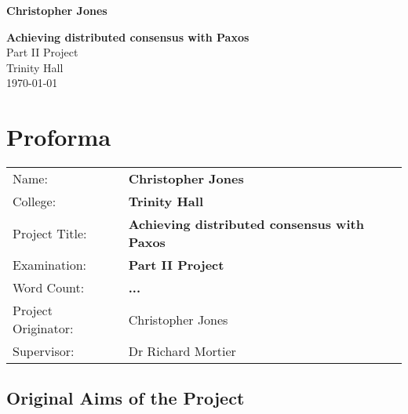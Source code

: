 \documentclass[12pt,twoside,notitlepage]{report}
\begin{document}




\pagestyle{empty}

\hfill{\LARGE \bf Christopher Jones}

\vspace*{60mm}
\begin{center}
\Huge
{\bf Achieving distributed consensus with Paxos} \\
\vspace*{5mm}
Part II Project \\
\vspace*{5mm}
Trinity Hall \\
\vspace*{5mm}
\today  %
\end{center}

\cleardoublepage



\setcounter{page}{1}
\pagestyle{plain}

\chapter*{Proforma}

{\large
\begin{tabular}{ll}
Name:               & \bf Christopher Jones                       \\
College:            & \bf Trinity Hall                     \\
Project Title:      & \bf Achieving distributed consensus with Paxos \\
Examination:        & \bf Part II Project        \\
Word Count:         & \bf ... \footnotemark[1] \\
Project Originator: & Christopher Jones                    \\
Supervisor:         & Dr Richard Mortier                    \\ 
\end{tabular}
}


\section*{Original Aims of the Project}
\end{document}
